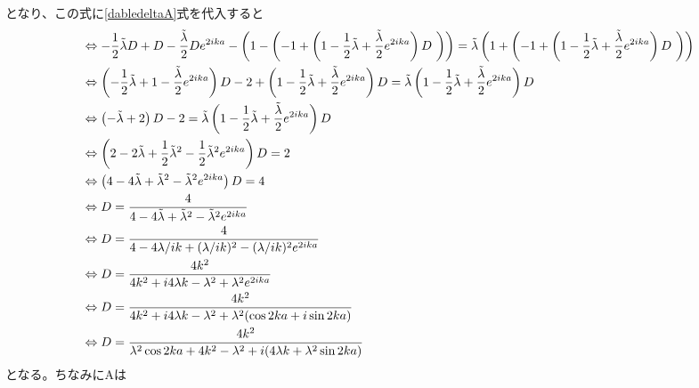 \documentclass{jsarticle}  %
\numberwithin{equation}{section} %
\numberwithin{figure}{section}
\begin{document}
    となり、この式に\eqref{dabledeltaA}式を代入すると
    \begin{align}
        &\Leftrightarrow -\frac{1}{2}\tilde{\lambda}D  + D  -\frac{\tilde{\lambda}}{2}De^{2ika} - \left(1-\left( -1 + \left( 1-\frac{1}{2}\tilde{\lambda}  +  \frac{\tilde{\lambda}}{2}e^{2ika} \right)D\ \right) \right) = \tilde{\lambda}\left(1+\left( -1 + \left( 1-\frac{1}{2}\tilde{\lambda}  +  \frac{\tilde{\lambda}}{2}e^{2ika} \right)D\ \right)\right)\notag \\
        &\Leftrightarrow \left( -\frac{1}{2}\tilde{\lambda}  + 1  -\frac{\tilde{\lambda}}{2}e^{2ika} \right)D - 2+ \left( 1-\frac{1}{2}\tilde{\lambda}  +  \frac{\tilde{\lambda}}{2}e^{2ika} \right)D  = \tilde{\lambda}\left( 1-\frac{1}{2}\tilde{\lambda}  +  \frac{\tilde{\lambda}}{2}e^{2ika} \right)D\ \notag \\
        &\Leftrightarrow \left( -\tilde{\lambda}  + 2   \right)D - 2= \tilde{\lambda}\left( 1-\frac{1}{2}\tilde{\lambda}  +  \frac{\tilde{\lambda}}{2}e^{2ika} \right)D\ \notag \\ 
        &\Leftrightarrow \left( 2 -2\tilde{\lambda} + \frac{1}{2}\tilde{\lambda}^2 - \frac{1}{2} \tilde{\lambda}^2 e^{2ika} \right)D = 2\notag \\
        &\Leftrightarrow \left( 4 -4\tilde{\lambda} + \tilde{\lambda}^2 - \tilde{\lambda}^2 e^{2ika} \right)D = 4\notag \\
        &\Leftrightarrow D = \frac{4}{4 -4\tilde{\lambda} + \tilde{\lambda}^2 - \tilde{\lambda}^2 e^{2ika}} \notag \\
        &\Leftrightarrow D = \frac{4}{4 -4\lambda / ik+ (\lambda/ik)^2 - (\lambda/ik)^2 e^{2ika}} \notag \\
        &\Leftrightarrow D = \frac{4k^2}{4k^2 +i4\lambda k- \lambda^2 +\lambda^2 e^{2ika}} \notag \\
        &\Leftrightarrow D = \frac{4k^2}{4k^2 +i4\lambda k- \lambda^2 +\lambda^2 (\cos 2ka + i\sin 2ka)} \notag \\
        &\Leftrightarrow D = \frac{4k^2}{\lambda^2 \cos 2ka + 4k^2 - \lambda^2+i(4\lambda k +\lambda^2  \sin 2ka)}
    \end{align}
    となる。ちなみにAは
\end{document}
